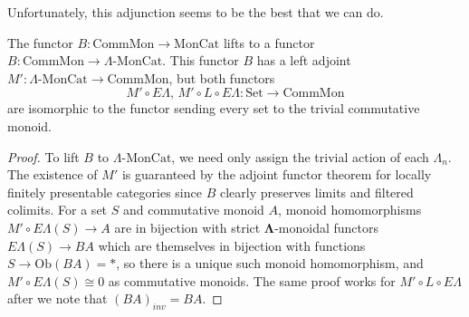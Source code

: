\documentclass{amsbook} %
\newcommand{\Set}{\ensuremath{\textrm{Set}}}
\newcommand{\ML}{\mathbf{\Lambda}}
\newcommand{\EL}{E\Lambda}
\newcommand{\ob}{\textrm{Ob}}
\newcommand{\lmc}{\Lambda\mbox{-}\textrm{MonCat}}
\newcommand{\sets}{\Set}
\newcommand{\cmon}{\ensuremath{\textrm{CommMon}}}
\newcommand{\moncat}{\ensuremath{\textrm{MonCat}}}
\numberwithin{section}{chapter}
\begin{document}
Unfortunately, this adjunction seems to be the best that we can do. 
\begin{prop}
The functor $B:\cmon \to \moncat$ lifts to a functor $B:\cmon \to \lmc$. This functor $B$ has a left adjoint $M':\lmc \to \cmon$, but both functors
\[
M' \circ \EL, \, M' \circ L \circ \EL : \sets \to \cmon
\]
are isomorphic to the functor sending every set to the trivial commutative monoid.
\end{prop}
\begin{proof}
To lift $B$ to $\lmc$, we need only assign the trivial action of each $\Lambda_n$. The existence of $M'$ is guaranteed by the adjoint functor theorem for locally finitely presentable categories since $B$ clearly preserves limits and filtered colimits.  For a set $S$ and commutative monoid $A$, monoid homomorphisms $M' \circ \EL(S) \to A$ are in bijection with strict $\ML$-monoidal functors $\EL(S) \to BA$ which are themselves in bijection with functions $S \to \ob(BA) = *$, so there is a unique such monoid homomorphism, and $M' \circ \EL(S) \cong 0$ as commutative monoids. The same proof works for $M' \circ L \circ \EL$ after we note that $(BA)_{inv} = BA$.
\end{proof}



\end{document}
